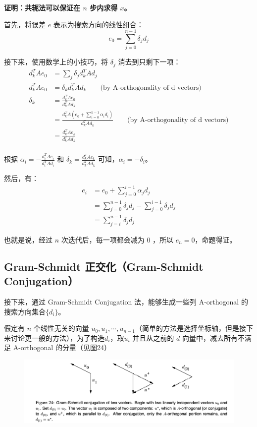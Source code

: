 \documentclass[12pt]{article}
\begin{document}
\begin{framed}
\textbf{证明：共轭法可以保证在 $n$ 步内求得 $x$。}

首先，将误差 $e$ 表示为搜索方向的线性组合：
$$
e_0 = \sum_{j=0}^{n-1}\delta_jd_j
$$

接下来，使用数学上的小技巧，将 $\delta_j$ 消去到只剩下一项：
\begin{align*}
d^T_kAe_0 &= \sum_j\delta_jd^T_kAd_j \\
d^T_kAe_0 &= \delta_kd^T_kAd_k \qquad \text{(by A-orthogonality of d vectors)} \\
\delta_k &= \frac{d^T_kAe_0}{d^T_kAd_k} \\
	&= \frac{d^T_kA(e_0 + \sum_{i=0}^{k-1}\alpha_id_i)}{d^T_kAd_k} \qquad \text{(by A-orthogonality of d vectors)} \\
	&= \frac{d^T_kAe_k}{d^T_kAd_k} \\
\end{align*}

根据 $\alpha_i = -\frac{d^T_iAe_i}{d^T_iAd_i}$ 和 $\delta_k = \frac{d^T_kAe_k}{d^T_kAd_k}$ 可知，$\alpha_i = -\delta_i$。

然后，有：
\begin{align*}
e_i &= e_0 + \sum_{j=0}^{i-1}\alpha_jd_j \\
	&= \sum_{j=0}^{n-1}\delta_jd_j - \sum_{j=0}^{i-1}\delta_jd_j \\
	&= \sum_{j=i}^{n-1}\delta_jd_j
\end{align*}

也就是说，经过 $n$ 次迭代后，每一项都会减为 0 ，所以 $e_n = 0$，命题得证。
\end{framed}

\subsection{Gram-Schmidt 正交化（Gram-Schmidt Conjugation）}
接下来，通过 Gram-Schmidt Conjugation 法，能够生成一些列 A-orthogonal 的搜索方向集合$\{d_i\}$。

假定有 $n$ 个线性无关的向量 $u_0, u_1, \cdots, u_{n-1}$（简单的方法是选择坐标轴，但是接下来讨论更一般的方法），为了构造$d_i$，取$u_i$ 并且从之前的 $d$ 向量中，减去所有不满足 A-orthogonal 的分量（见图24）
\begin{figure}[H]
    \centering
    \includegraphics[width=1\textwidth]{fig/CG_Gram_Schmidt_Example.png}
\end{figure}
\end{document}
